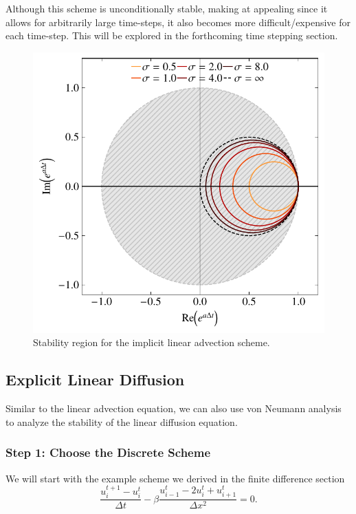 \begin{remark}
Although this scheme is unconditionally stable, making at appealing since it allows for arbitrarily large time-steps, it also becomes more difficult/expensive for each time-step. This will be explored in the forthcoming time stepping section.
\end{remark}

\begin{figure}[htbp]
	\centering
	\includegraphics[width=0.6\linewidth]{Pictures/implicit_advection}
	\caption{Stability region for the implicit linear advection scheme.}
	\label{fig:implicit_advection}
\end{figure}

\subsection{Explicit Linear Diffusion}
Similar to the linear advection equation, we can also use von Neumann analysis to analyze the stability of the linear diffusion equation. 

\subsubsection{Step 1: Choose the Discrete Scheme}
We will start with the example scheme we derived in the finite difference section
\begin{equation}
  \frac{u_i^{t+1} - u_{i}^t}{\Delta t} - \beta \frac{u_{i-1}^t - 2u_i^t + u_{i+1}^t}{\Delta x^2} = 0.
\end{equation}

